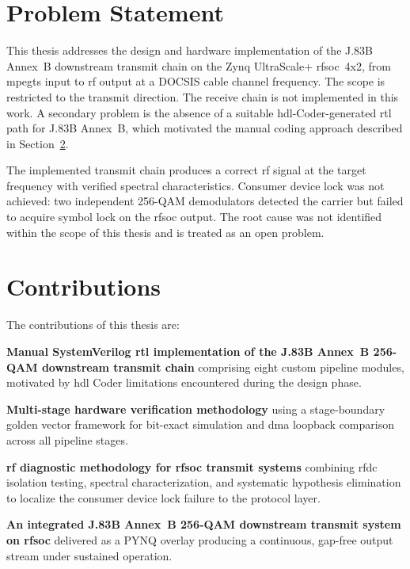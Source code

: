 \section{Problem Statement}
\label{sec:problem_statement}

This thesis addresses the design and hardware implementation of
the J.83B Annex~B downstream transmit chain on the Zynq
UltraScale+ \ac{rfsoc}~4x2, from \ac{mpegts} input to \ac{rf}
output at a DOCSIS cable channel frequency.
The scope is restricted to the transmit direction.
The receive chain is not implemented in this work.
A secondary problem is the absence of a suitable
\ac{hdl}-Coder-generated \ac{rtl} path for J.83B Annex~B, which
motivated the manual coding approach described in
Section~\ref{sec:contributions}.

The implemented transmit chain produces a correct \ac{rf} signal
at the target frequency with verified spectral characteristics.
Consumer device lock was not achieved: two independent 256-QAM
demodulators detected the carrier but failed to acquire symbol
lock on the \ac{rfsoc} output.
The root cause was not identified within the scope of this thesis
and is treated as an open problem.

\section{Contributions}
\label{sec:contributions}

The contributions of this thesis are:

\begin{tightemize}

  \item \textbf{Manual SystemVerilog \ac{rtl} implementation of
        the J.83B Annex~B 256-QAM downstream transmit chain}
        comprising eight custom pipeline modules, motivated by
        \ac{hdl} Coder limitations encountered during the design
        phase.

  \item \textbf{Multi-stage hardware verification methodology}
        using a stage-boundary golden vector framework for
        bit-exact simulation and \ac{dma} loopback comparison
        across all pipeline stages.

  \item \textbf{\ac{rf} diagnostic methodology for \ac{rfsoc}
        transmit systems} combining \ac{rfdc} isolation testing,
        spectral characterization, and systematic hypothesis
        elimination to localize the consumer device lock failure
        to the protocol layer.

  \item \textbf{An integrated J.83B Annex~B 256-QAM downstream
        transmit system on \ac{rfsoc}} delivered as a PYNQ
        overlay producing a continuous, gap-free output stream
        under sustained operation.

\end{tightemize}

